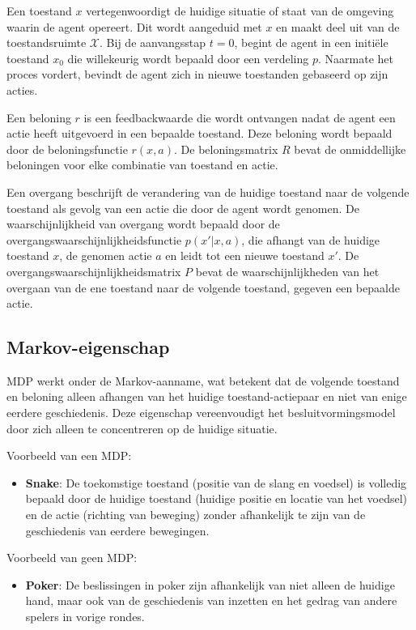 \documentclass[a4paper,12pt]{report}
\begin{document}
Een toestand \( x \) vertegenwoordigt de huidige situatie of staat van de
omgeving waarin de agent opereert. Dit wordt aangeduid met \( x \) en maakt
deel uit van de toestandsruimte \( \mathcal{X} \). Bij de aanvangsstap \( t = 0
\), begint de agent in een initiële toestand \( x_0 \) die willekeurig wordt
bepaald door een verdeling \( p \). Naarmate het proces vordert, bevindt de
agent zich in nieuwe toestanden gebaseerd op zijn acties.

Een beloning \( r \) is een feedbackwaarde die wordt ontvangen nadat de agent
een actie heeft uitgevoerd in een bepaalde toestand. Deze beloning wordt
bepaald door de beloningsfunctie \( r(x, a) \). De beloningsmatrix \( R \)
bevat de onmiddellijke beloningen voor elke combinatie van toestand en actie.

Een overgang beschrijft de verandering van de huidige toestand naar de volgende
toestand als gevolg van een actie die door de agent wordt genomen. De
waarschijnlijkheid van overgang wordt bepaald door de
overgangswaarschijnlijkheidsfunctie \( p(x'|x, a) \), die afhangt van de
huidige toestand \( x \), de genomen actie \( a \) en leidt tot een nieuwe
toestand \( x' \). De overgangswaarschijnlijkheidsmatrix \( P \) bevat de
waarschijnlijkheden van het overgaan van de ene toestand naar de volgende
toestand, gegeven een bepaalde actie.

\subsection{Markov-eigenschap}

MDP werkt onder de Markov-aanname, wat betekent dat de volgende toestand en beloning alleen afhangen van het huidige toestand-actiepaar en niet van enige eerdere geschiedenis. Deze eigenschap vereenvoudigt het besluitvormingsmodel door zich alleen te concentreren op de huidige situatie.

Voorbeeld van een MDP:
\begin{itemize}
    \item \textbf{Snake}: De toekomstige toestand (positie van de slang en voedsel) is volledig bepaald door de huidige toestand (huidige positie en locatie van het voedsel) en de actie (richting van beweging) zonder afhankelijk te zijn van de geschiedenis van eerdere bewegingen.
\end{itemize}

Voorbeeld van geen MDP:
\begin{itemize}
    \item \textbf{Poker}: De beslissingen in poker zijn afhankelijk van niet alleen de huidige hand, maar ook van de geschiedenis van inzetten en het gedrag van andere spelers in vorige rondes.
\end{itemize}
\end{document}
